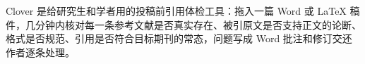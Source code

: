 \documentclass[UTF8,zihao=5,fontset=none]{ctexart}
\begin{document}

\vspace{10pt}
{\fontsize{14pt}{25pt}\selectfont
Clover 是给研究生和学者用的投稿前引用体检工具：拖入一篇 Word 或 LaTeX 稿件，几分钟内核对每一条参考文献是否真实存在、被引原文是否支持正文的论断、格式是否规范、引用是否符合目标期刊的常态，问题写成 Word 批注和修订交还作者逐条处理。\par}
\end{document}
